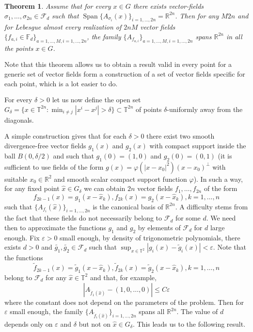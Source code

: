 \documentclass[11pt,a4paper]{article}%
\newtheorem{theorem}{Theorem}
\begin{document}
\begin{theorem}
Assume that for every $x \in G$ there exists vector-fields $\sigma_{1},
\ldots,  \sigma_{2 n} \in\mathcal{F}_{d}$ such that $\operatorname{Span}
\{A_{\sigma_{i}} (x)\}_{i = 1, \ldots, 2 n}=\mathbb{R}^{2 n}$. Then for any $M
2 n$ and for Lebesgue almost every  realization of $2 n M$ vector fields
$\{f_{a, i} \in\mathbb{F}_{d} \}_{a = 1, \ldots, M, i = 1, \ldots, 2 n}$, the
family $\{A_{f_{a, i}} \}_{a = 1, \ldots, M, i = 1, \ldots, 2 n}$ spans
$\mathbb{R}^{2 n}$ in all the points $x \in G$.
\end{theorem}

Note that this theorem allows us to obtain a result valid in every point for a
generic set of vector fields form a construction of a set of vector fields
specific for each point, which is a lot easier to do.

For every $\delta> 0$ let us now define the open set $G_{\delta} =\{x
\in\mathbb{T}^{2 n} : \min_{i \neq j} |x^{i} - x^{j} | > \delta\}
\subset\mathbb{T}^{2 n}$ of points $\delta$-uniformly away from the diagonals.

A simple construction gives that for each $\delta>0$ there exist two smooth
divergence-free vector fields $g_{1}(x)$ and $g_{2}(x)$ with compact support
inside the ball $B(0,\delta/2)$ and such that $g_{1}(0)=(1,0)$ and
$g_{2}(0)=(0,1)$ (it is sufficient to use fields of the form $g\left(
x\right)  =\varphi( \vert x-x_{0}\vert ^{2}) (
x-x_{0})  ^{\perp}$ with suitable $x_{0}\in\mathbb{R}^{2}$ and smooth
scalar compact support function $\varphi$). In such a way, for any fixed point
$\hat{x}\in G_{\delta}$ we can obtain $2n$ vector fields $f_{1},\ldots,f_{2n}$
of the form
\[
f_{2k-1}(x)=g_{1}(x-\hat{x}_{k}),f_{2k}(x)=g_{2}(x-\hat{x}_{k}),k=1,\ldots,n
\]
such that $\{A_{f_{i}}(\hat{x})\}_{i=1,\ldots,2n}$ is the canonical basis of
$\mathbb{R}^{2n}$. A difficulty stems from the fact that these fields do not
necessarily belong to $\mathcal{F}_{d}$ for some $d$. We need then to
approximate the functions $g_{1}$ and $g_{2}$ by elements of $\mathcal{F}_{d}$
for $d$ large enough. Fix $\varepsilon>0$ small enough, by density of
trigonometric polynomials, there exists $d>0$ and $\widetilde{g_{1}%
},\widetilde{g_{2}}\in\mathcal{F}_{d}$ such that $\sup_{x\in\mathbb{T}^{2}%
}|g_{i}(x)-\tilde{g}_{i}(x)|<\varepsilon$. Note that the functions
\[
\tilde{f}_{2k-1}(x)=\tilde{g}_{1}(x-\hat{x}_{k}),\tilde{f}_{2k}(x)=\tilde
{g}_{2}(x-\hat{x}_{k}),k=1,\ldots,n
\]
belong to $\mathcal{F}_{d}$ for any $\hat{x}\in\mathbb{T}^{2}$ and that, for
example,
\[
|A_{\tilde{f}_{1}(\hat{x})}-(1,0,\ldots,0)|\leqslant C\varepsilon
\]
where the constant does not depend on the parameters of the problem. Then for
$\varepsilon$ small enough, the family $\{A_{\tilde{f}_{i}(\hat{x}%
)}\}_{i=1,\ldots,2n}$ spans all $\mathbb{R}^{2n}$. The value of $d$ depends
only on $\varepsilon$ and $\delta$ but not on $\hat{x}\in G_{\delta}$. This leads us to the following result.
\end{document}
